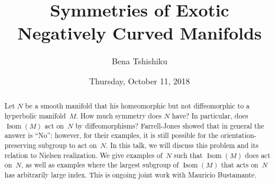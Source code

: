 \documentclass{UAmathtalk}
\author{Bena Tshishiku}
\title{Symmetries of Exotic\\ Negatively Curved Manifolds}
\date{Thursday, October 11, 2018}
\begin{document}
\maketitle

\begin{abstract}
Let $N$ be a smooth manifold that his homeomorphic but not diffeomorphic to a hyperbolic manifold~$M$. How much symmetry does $N$ have? In particular, does $\operatorname{Isom}(M)$ act on~$N$ by diffeomorphisms? Farrell-Jones showed that in general the answer is ``No''; however, for their examples, it is still possible for the orientation-preserving subgroup to act on~$N$. In this talk, we will discuss this problem and its relation to Nielsen realization. We give examples of~$N$ such that $\operatorname{Isom}(M)$ does act on~$N$, as well as examples where the largest subgroup of $\operatorname{Isom}(M)$ that acts on~$N$ has arbitrarily large index. This is ongoing joint work with Mauricio Bustamante.
\end{abstract}
\end{document}
